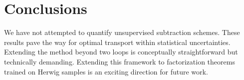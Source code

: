 \section{Conclusions}\label{sec:conclusions}

We have not attempted to quantify unsupervised subtraction schemes.
These results pave the way for optimal transport within statistical
uncertainties. Extending the method beyond two loops is conceptually
straightforward but technically demanding. Extending this framework to
factorization theorems trained on Herwig samples is an exciting
direction for future work.

